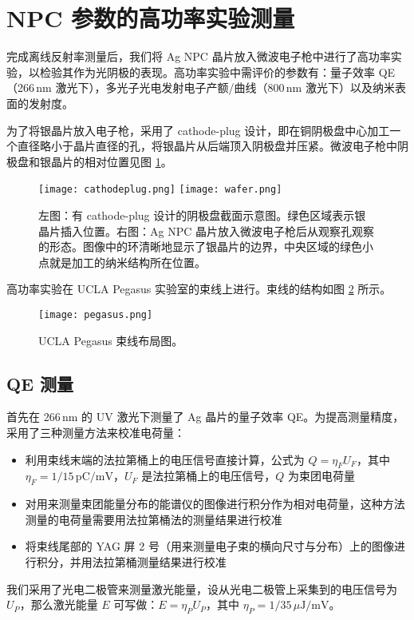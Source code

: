 \section{NPC 参数的高功率实验测量}
完成离线反射率测量后，我们将 Ag NPC 晶片放入微波电子枪中进行了高功率实验，以检验其作为光阴极的表现。高功率实验中需评价的参数有：量子效率 QE（266\,nm 激光下），多光子光电发射电子产额/曲线（800\,nm 激光下）以及纳米表面的发射度。

为了将银晶片放入电子枪，采用了 cathode-plug 设计，即在铜阴极盘中心加工一个直径略小于晶片直径的孔，将银晶片从后端顶入阴极盘并压紧。微波电子枪中阴极盘和银晶片的相对位置见图 \ref{fig:Ag wafer}。
\begin{figure}[htbp]
\begin{center}
\texttt{[image: cathodeplug.png]}
\texttt{[image: wafer.png]}
\caption{\label{fig:Ag wafer} 
左图：有 cathode-plug 设计的阴极盘截面示意图。绿色区域表示银晶片插入位置。右图：Ag NPC 晶片放入微波电子枪后从观察孔观察的形态。图像中的环清晰地显示了银晶片的边界，中央区域的绿色小点就是加工的纳米结构所在位置。}
\end{center}
\end{figure}

高功率实验在 UCLA Pegasus 实验室的束线上进行。束线的结构如图 \ref{fig:pegasus} 所示。
\begin{figure}[htbp]
\begin{center}
\texttt{[image: pegasus.png]}
\caption{\label{fig:pegasus} UCLA Pegasus 束线布局图。}
\end{center}
\end{figure}

\subsection{QE 测量}
首先在 266\,nm 的 UV 激光下测量了 Ag 晶片的量子效率 QE。为提高测量精度，采用了三种测量方法来校准电荷量：
\begin{itemize}
\item 利用束线末端的法拉第桶上的电压信号直接计算，公式为 $Q = \eta_FU_F$，其中 $\eta_F=1/15\,\text{pC/mV}$，$U_F$ 是法拉第桶上的电压信号，$Q$ 为束团电荷量
\item 对用来测量束团能量分布的能谱仪的图像进行积分作为相对电荷量，这种方法测量的电荷量需要用法拉第桶法的测量结果进行校准
\item 将束线尾部的 YAG 屏 2 号（用来测量电子束的横向尺寸与分布）上的图像进行积分，并用法拉第桶测量结果进行校准
\end{itemize}
我们采用了光电二极管来测量激光能量，设从光电二极管上采集到的电压信号为 $U_P$，那么激光能量 $E$ 可写做：$E = \eta_PU_P$，其中 $\eta_P=1/35\,\mu\text{J/mV}$。

